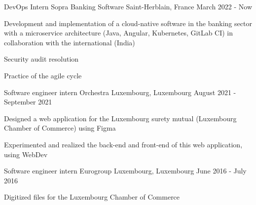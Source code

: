 
\begin{cventries}
  \cventry
    {DevOps Intern} %
    {Sopra Banking Software} %
    {Saint-Herblain, France} %
    {March 2022 - Now} %
    {
      \begin{cvitems} %
        \item {Development and implementation of a cloud-native software in the banking sector with a microservice architecture (Java, Angular, Kubernetes, GitLab CI) in collaboration with the international (India)}
        \item {Security audit resolution}
        \item {Practice of the agile cycle}
      \end{cvitems}
    }
    
  \cventry
    {Software engineer intern} %
    {Orchestra} %
    {Luxembourg, Luxembourg} %
    {August 2021 - September 2021} %
    {
      \begin{cvitems} %
        \item {Designed a web application for the Luxembourg surety mutual (Luxembourg Chamber of Commerce) using Figma}
        \item {Experimented and realized the back-end and front-end of this web application, using WebDev}
      \end{cvitems}
    }

  \cventry
    {Software engineer intern} %
    {Eurogroup} %
    {Luxembourg, Luxembourg} %
    {June 2016 - July 2016} %
    {
      \begin{cvitems} %
        \item {Digitized files for the Luxembourg Chamber of Commerce}
      \end{cvitems}
    }

\end{cventries}
